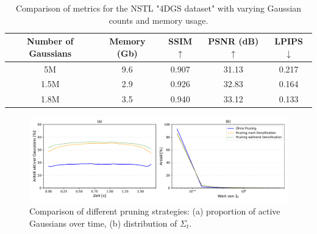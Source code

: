 \begin{table}[h]
    \centering
    \caption{Comparison of metrics for the NSTL "4DGS dataset" with varying Gaussian counts and memory usage.}
    \label{tab:4dgs_metrics}
    \begin{tabular}{ccccc}
        \toprule
        Number of Gaussians & Memory (Gb) & SSIM $\uparrow$ & PSNR (dB) $\uparrow$ & LPIPS $\downarrow$ \\
        \midrule
        5M   & 9.6 & 0.907 & 31.13 & 0.217 \\
        1.5M & 2.9 & 0.926 & 32.83 & 0.164 \\
        1.8M & 3.5 & 0.940 & 33.12 & 0.133 \\
        \bottomrule
    \end{tabular}
\end{table}

\begin{figure}
    \centering
    \includegraphics[width=1\linewidth]{bilder//Results//Wang//Prune/Overview_Pruning.pdf}
    \caption{Comparison of different pruning strategies: 
    (a) proportion of active Gaussians over time, 
    (b) distribution of $\Sigma_t$.}
    \label{fig:Pruning_overview}
\end{figure}

